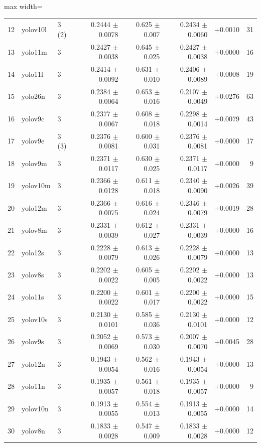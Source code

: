 \documentclass[10pt]{article}
\begin{document}
\begin{table}[htbp]
\begin{adjustbox}{max width=\linewidth}
\begin{tabular}{rllrrrrr}
12 & yolov10l & 3 (2\textdagger{}) & 0.2444 $\pm$ 0.0078 & 0.625 $\pm$ 0.007 & 0.2434 $\pm$ 0.0060 & +0.0010 & 31 \\
13 & yolo11m & 3 & 0.2427 $\pm$ 0.0038 & 0.645 $\pm$ 0.025 & 0.2427 $\pm$ 0.0038 & +0.0000 & 16 \\
14 & yolo11l & 3 & 0.2414 $\pm$ 0.0092 & 0.631 $\pm$ 0.010 & 0.2406 $\pm$ 0.0089 & +0.0008 & 19 \\
15 & yolo26n & 3 & 0.2384 $\pm$ 0.0064 & 0.653 $\pm$ 0.016 & 0.2107 $\pm$ 0.0049 & +0.0276 & 63 \\
16 & yolov9c & 3 & 0.2377 $\pm$ 0.0067 & 0.608 $\pm$ 0.018 & 0.2298 $\pm$ 0.0014 & +0.0079 & 43 \\
17 & yolov9e & 3 (3\textdagger{}) & 0.2376 $\pm$ 0.0081 & 0.600 $\pm$ 0.031 & 0.2376 $\pm$ 0.0081 & +0.0000 & 17 \\
18 & yolov9m & 3 & 0.2371 $\pm$ 0.0117 & 0.630 $\pm$ 0.025 & 0.2371 $\pm$ 0.0117 & +0.0000 & 9 \\
19 & yolov10m & 3 & 0.2366 $\pm$ 0.0128 & 0.611 $\pm$ 0.018 & 0.2340 $\pm$ 0.0090 & +0.0026 & 39 \\
20 & yolo12m & 3 & 0.2366 $\pm$ 0.0075 & 0.616 $\pm$ 0.024 & 0.2346 $\pm$ 0.0079 & +0.0019 & 28 \\
21 & yolov8m & 3 & 0.2331 $\pm$ 0.0039 & 0.612 $\pm$ 0.027 & 0.2331 $\pm$ 0.0039 & +0.0000 & 16 \\
22 & yolo12s & 3 & 0.2228 $\pm$ 0.0079 & 0.613 $\pm$ 0.026 & 0.2228 $\pm$ 0.0079 & +0.0000 & 13 \\
23 & yolov8s & 3 & 0.2202 $\pm$ 0.0022 & 0.605 $\pm$ 0.005 & 0.2202 $\pm$ 0.0022 & +0.0000 & 13 \\
24 & yolo11s & 3 & 0.2200 $\pm$ 0.0022 & 0.601 $\pm$ 0.017 & 0.2200 $\pm$ 0.0022 & +0.0000 & 15 \\
25 & yolov10s & 3 & 0.2130 $\pm$ 0.0101 & 0.585 $\pm$ 0.036 & 0.2130 $\pm$ 0.0101 & +0.0000 & 12 \\
26 & yolov9s & 3 & 0.2052 $\pm$ 0.0069 & 0.573 $\pm$ 0.030 & 0.2007 $\pm$ 0.0070 & +0.0045 & 28 \\
27 & yolo12n & 3 & 0.1943 $\pm$ 0.0054 & 0.562 $\pm$ 0.016 & 0.1943 $\pm$ 0.0054 & +0.0000 & 13 \\
28 & yolo11n & 3 & 0.1935 $\pm$ 0.0057 & 0.561 $\pm$ 0.018 & 0.1935 $\pm$ 0.0057 & +0.0000 & 9 \\
29 & yolov10n & 3 & 0.1913 $\pm$ 0.0055 & 0.554 $\pm$ 0.013 & 0.1913 $\pm$ 0.0055 & +0.0000 & 14 \\
30 & yolov8n & 3 & 0.1833 $\pm$ 0.0028 & 0.547 $\pm$ 0.009 & 0.1833 $\pm$ 0.0028 & +0.0000 & 12 \\

\end{tabular}
\end{adjustbox}
\end{table}
\end{document}
